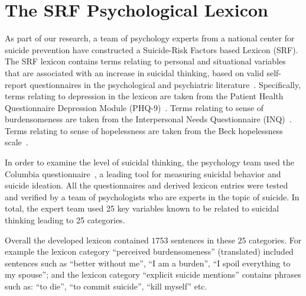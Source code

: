 \documentclass[letterpaper]{article} %
\begin{document}
\section{The SRF Psychological Lexicon}
As part of our research, a   team of psychology experts from a national center  for suicide prevention  have constructed a Suicide-Risk Factors based Lexicon (SRF).
The SRF lexicon contains terms relating  to  personal and situational variables that are associated with an increase in suicidal thinking, based on  valid self-report questionnaires in the  psychological and psychiatric literature~\cite{klonsky2015three,turecki2016suicide,nock2008suicide}. 
Specifically,  terms relating to depression in the lexicon are taken from the Patient Health Questionnaire Depression Module (PHQ-9)~\cite{kroenke2001phq}.
 Terms relating to sense of burdensomeness are taken from the Interpersonal Needs Questionnaire (INQ)~\cite{van2012thwarted}.
 Terms relating to sense of hopelessness are taken from the Beck hopelessness scale~\cite{beck}.

 In order to examine the level of suicidal thinking, the psychology team used the Columbia questionnaire~\cite{posner2008columbia}, a leading tool for measuring suicidal behavior and suicide ideation. All the questionnaires and derived lexicon entries were tested and verified by a team of psychologists who are experts in the topic of suicide. In total, the expert team used 25 key variables known to be related to suicidal thinking leading to 25 categories. 

Overall the developed lexicon contained $1753$ sentences in these $25$ categories. For example the  
lexicon category ``perceived burdensomeness” (translated) included sentences such as ``better without me”, ``I am a burden”, ``I spoil everything to my spouse”; and the lexicon category “explicit suicide mentions” contains phrases such as: ``to die'', ``to commit suicide'', ``kill myself'' etc. 

\end{document}
